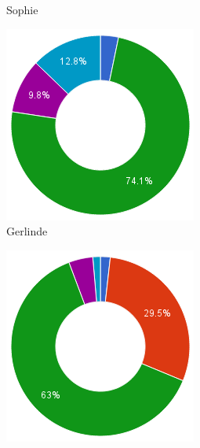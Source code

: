 \documentclass[eind]{penoverslag}
\begin{document}
\begin{figure}[h]
\begin{subfigure}[hb]{0.15\textwidth}
                \caption{Sophie}
        \end{subfigure}%
        \begin{subfigure}[hb]{0.15\textwidth}
                \centering
                \includegraphics[width=\textwidth]{werk_Gerlinde}
                \caption{Gerlinde}
        \end{subfigure}%
        \begin{subfigure}[hb]{0.15\textwidth}
                \centering
                \includegraphics[width=\textwidth]{werk_Maxim}

\end{subfigure}
\end{figure}
\end{document}

